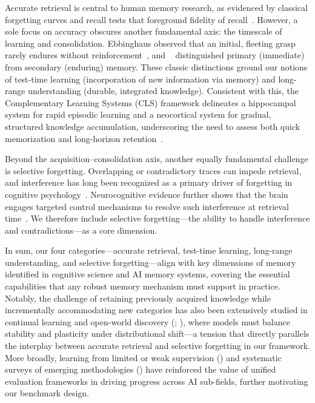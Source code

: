 Accurate retrieval is central to human memory research, as evidenced by classical forgetting curves and recall tests that foreground fidelity of recall~\citep{Ebbinghaus2013Memory}. However, a sole focus on accuracy obscures another fundamental axis: the timescale of learning and consolidation. Ebbinghaus observed that an initial, fleeting grasp rarely endures without reinforcement~\citep{Ebbinghaus2013Memory}, and ~\citet{James1890PrinciplesV1} distinguished primary (immediate) from secondary (enduring) memory. These classic distinctions ground our notions of test-time learning (incorporation of new information via memory) and long-range understanding (durable, integrated knowledge). Consistent with this, the Complementary Learning Systems (CLS) framework delineates a hippocampal system for rapid episodic learning and a neocortical system for gradual, structured knowledge accumulation, underscoring the need to assess both quick memorization and long-horizon retention~\citep{McClelland1995CLS}.

Beyond the acquisition–consolidation axis, another equally fundamental challenge is selective forgetting. Overlapping or contradictory traces can impede retrieval, and interference has long been recognized as a primary driver of forgetting in cognitive psychology~\citep{AndersonNeely1996Interference}. Neurocognitive evidence further shows that the brain engages targeted control mechanisms to resolve such interference at retrieval time~\citep{Wimber2015AdaptiveForgetting}. We therefore include selective forgetting—the ability to handle interference and contradictions—as a core dimension.

In sum, our four categories—accurate retrieval, test-time learning, long-range understanding, and selective forgetting—align with key dimensions of memory identified in cognitive science and AI memory systems, covering the essential capabilities that any robust memory mechanism must support in practice. Notably, the challenge of retaining previously acquired knowledge while incrementally accommodating new categories has also been extensively studied in continual learning and open-world discovery (\cite{fengprism}; \cite{feng2026generalized}), where models must balance stability and plasticity under distributional shift—a tension that directly parallels the interplay between accurate retrieval and selective forgetting in our framework. More broadly, learning from limited or weak supervision (\cite{he2024weakly}) and systematic surveys of emerging methodologies (\cite{he2024diffusion}) have reinforced the value of unified evaluation frameworks in driving progress across AI sub-fields, further motivating our benchmark design.







